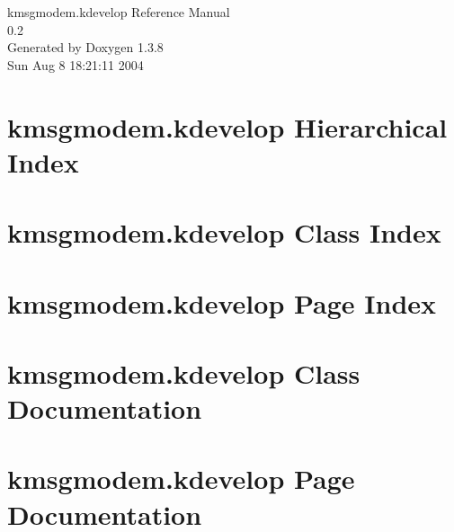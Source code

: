 \documentclass[a4paper]{book}
\begin{document}
\begin{titlepage}
\vspace*{7cm}
\begin{center}
{\Large kmsgmodem.kdevelop Reference Manual\\[1ex]\large 0.2 }\\
\vspace*{1cm}
{\large Generated by Doxygen 1.3.8}\\
\vspace*{0.5cm}
{\small Sun Aug 8 18:21:11 2004}\\
\end{center}
\end{titlepage}
\clearemptydoublepage
{}
\tableofcontents
\clearemptydoublepage
{}
\chapter{kmsgmodem.kdevelop Hierarchical Index}

\chapter{kmsgmodem.kdevelop Class Index}

\chapter{kmsgmodem.kdevelop Page Index}

\chapter{kmsgmodem.kdevelop Class Documentation}







\chapter{kmsgmodem.kdevelop Page Documentation}

\printindex
\end{document}
